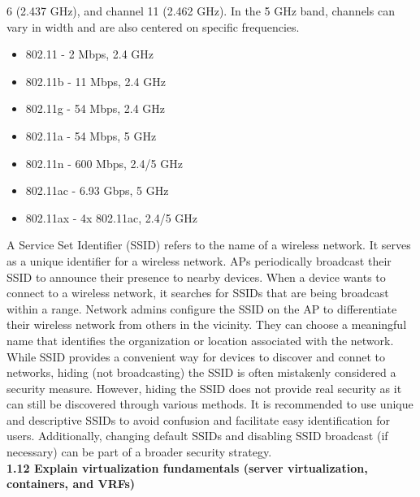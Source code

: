 \documentclass{article}
\begin{document}
6 (2.437 GHz), and channel 11 (2.462 GHz). In the 5 GHz band, channels can vary in width and are also centered on specific frequencies.

\begin{itemize}	
\item 802.11 - 2 Mbps, 2.4 GHz
\item 802.11b - 11 Mbps, 2.4 GHz
\item 802.11g - 54 Mbps, 2.4 GHz
\item 802.11a - 54 Mbps, 5 GHz
\item 802.11n - 600 Mbps, 2.4/5 GHz
\item 802.11ac - 6.93 Gbps, 5 GHz
\item 802.11ax - 4x 802.11ac, 2.4/5 GHz
\end{itemize}

	A Service Set Identifier (SSID) refers to the name of a wireless network. It serves as a unique identifier for a wireless network. APs periodically broadcast their SSID to announce their presence to nearby devices. When a device wants to connect to a wireless network, it searches for SSIDs that are being broadcast within a range. Network admins configure the SSID on the AP to differentiate their wireless network from others in the vicinity. They can choose a meaningful name that identifies the organization or location associated with the network. While SSID provides a convenient way for devices to discover and connet to networks, hiding (not broadcasting) the SSID is often mistakenly considered a security measure. However, hiding the SSID does not provide real security as it can still be discovered through various methods. It is recommended to use unique and descriptive SSIDs to avoid confusion and facilitate easy identification for users. Additionally, changing default SSIDs and disabling SSID broadcast (if necessary) can be part of a broader security strategy.\\
 
 \textbf{1.12 Explain virtualization fundamentals (server virtualization, containers, and VRFs)}\\
 
\end{document}
